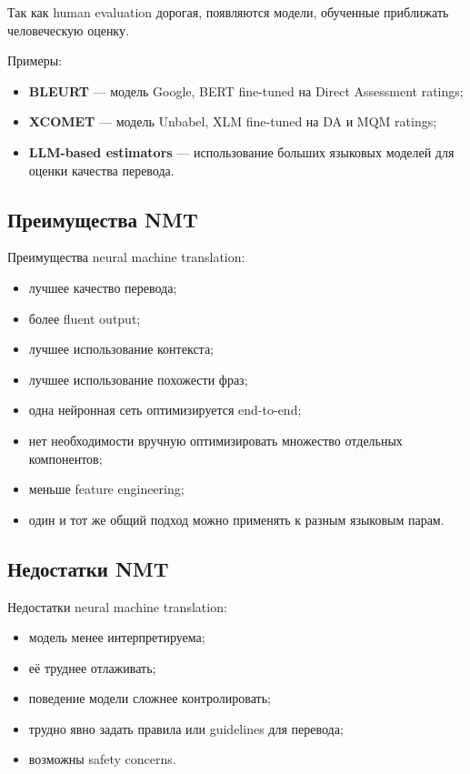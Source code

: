 \documentclass[a4paper,12pt]{article}
\begin{document}
Так как human evaluation дорогая, появляются модели, обученные приближать человеческую оценку.

Примеры:

\begin{itemize}
    \item \textbf{BLEURT} --- модель Google, BERT fine-tuned на Direct Assessment ratings;
    \item \textbf{XCOMET} --- модель Unbabel, XLM fine-tuned на DA и MQM ratings;
    \item \textbf{LLM-based estimators} --- использование больших языковых моделей для оценки качества перевода.
\end{itemize}

\subsection{Преимущества NMT}

Преимущества neural machine translation:

\begin{itemize}
    \item лучшее качество перевода;
    \item более fluent output;
    \item лучшее использование контекста;
    \item лучшее использование похожести фраз;
    \item одна нейронная сеть оптимизируется end-to-end;
    \item нет необходимости вручную оптимизировать множество отдельных компонентов;
    \item меньше feature engineering;
    \item один и тот же общий подход можно применять к разным языковым парам.
\end{itemize}

\subsection{Недостатки NMT}

Недостатки neural machine translation:

\begin{itemize}
    \item модель менее интерпретируема;
    \item её труднее отлаживать;
    \item поведение модели сложнее контролировать;
    \item трудно явно задать правила или guidelines для перевода;
    \item возможны safety concerns.
\end{itemize}
\end{document}
